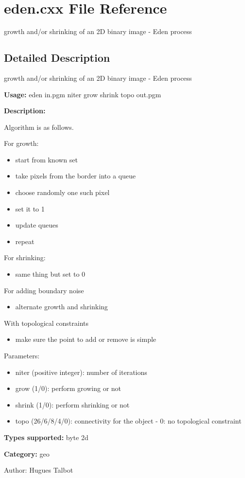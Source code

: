\section{eden.cxx File Reference}
\label{eden_8cxx}
growth and/or shrinking of an 2D binary image - Eden process 



\subsection{Detailed Description}
growth and/or shrinking of an 2D binary image - Eden process 

{\bf Usage:} eden in.pgm niter grow shrink topo out.pgm

{\bf Description:}

Algorithm is as follows.

For growth: \begin{itemize}
\item start from known set \item take pixels from the border into a queue \item choose randomly one such pixel \item set it to 1 \item update queues \item repeat\end{itemize}
For shrinking: \begin{itemize}
\item same thing but set to 0\end{itemize}
For adding boundary noise \begin{itemize}
\item alternate growth and shrinking\end{itemize}
With topological constraints \begin{itemize}
\item make sure the point to add or remove is simple\end{itemize}
Parameters: \begin{itemize}
\item niter (positive integer): number of iterations \item grow (1/0): perform growing or not \item shrink (1/0): perform shrinking or not \item topo (26/6/8/4/0): connectivity for the object - 0: no topological constraint\end{itemize}
{\bf Types supported:} byte 2d

{\bf Category:} geo

\begin{Desc}
\item[Author:]Hugues Talbot \end{Desc}
